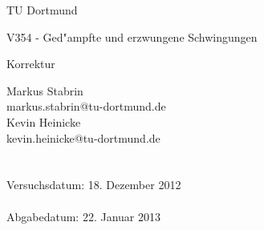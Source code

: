 \documentclass{scrartcl}
\begin{document}
	
	\vspace*{3cm}

	\begin{center}
		\large
		TU Dortmund
	\end{center}

	\begin{center}
		\Huge
		V354 - Ged"ampfte und erzwungene Schwingungen
	\end{center}

	\begin{center}
		\large
		Korrektur
	\end{center}

	\vspace{5cm}
	\begin{center}
		\begin{minipage}[b]{8cm}
			\Large
			Markus Stabrin \\
			\normalsize
			markus.stabrin@tu-dortmund.de \\

			\Large
			Kevin Heinicke\\
			\normalsize
			kevin.heinicke@tu-dortmund.de \\
			\\
			\\

			Versuchsdatum: 18. Dezember 2012 \\
			\\
			Abgabedatum: 22. Januar 2013
		\end{minipage}
	\end{center}

	\newpage

	

	

	

	
\end{document}

